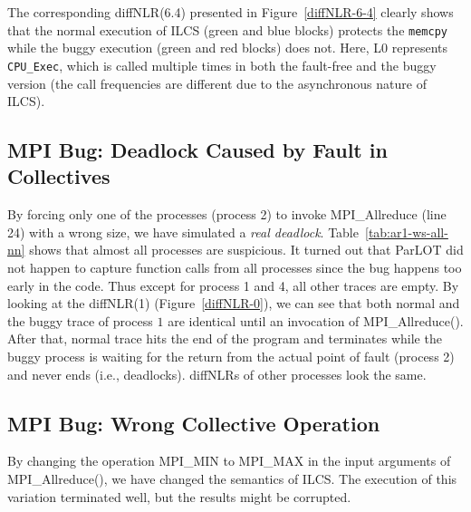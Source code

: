 The corresponding diffNLR(6.4) presented in Figure~\ref{diffNLR-6-4} clearly shows that the normal execution of ILCS (green and blue blocks) protects the \texttt{memcpy} while the buggy execution (green and red blocks) does not. Here, L0 represents \texttt{CPU\_Exec}, which is called multiple times in both the fault-free and the buggy version (the call frequencies are different due to the asynchronous nature of ILCS).
%





\subsection{MPI Bug: Deadlock Caused by Fault in Collectives}
By forcing only one of the processes (process 2) to invoke MPI\_Allreduce (line 24) with a wrong size, we have simulated a \textit{real deadlock}. 
%
Table~\ref{tab:ar1-ws-all-nn} shows that almost all processes are suspicious.
%
It turned out that ParLOT did not happen to capture function calls from all processes since the bug happens too early in the code. Thus except for process 1 and 4, all other traces are empty.
%
By looking at the diffNLR(1) (Figure~\ref{diffNLR-0}), we can see that both normal and the buggy trace of process $1$ are identical until an invocation of MPI\_Allreduce(). After that, normal trace hits the end of the program and terminates while the buggy process is waiting for the return from the actual point of fault (process 2) and never ends (i.e., deadlocks). 
%
diffNLRs of other processes look the same.
%

%

%





\subsection{MPI Bug: Wrong Collective Operation}
By changing the operation MPI\_MIN to MPI\_MAX in the input arguments of MPI\_Allreduce(), we have changed the semantics of ILCS. 
%
The execution of this variation terminated well, but the results might be corrupted.
%

